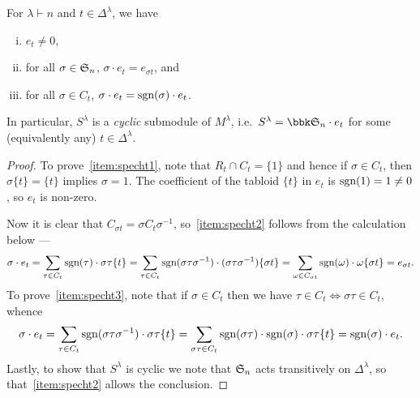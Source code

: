 \begin{lemma}
    \label{lem:polytabloidaction}
    For $\lambda \vdash n$ and $t\in \Delta^\lambda$, we have
    \begin{enumerate}[(i)]
        \item\label{item:specht1} $e_t\neq 0$, 
        \item\label{item:specht2} for all $\sigma\in\mathfrak{S}_{n}$, $\sigma\cdot e_t =
            e_{\sigma t}$, and 
        \item\label{item:specht3} for all $\sigma\in C_t$, $\sigma\cdot e_t =
            \textnormal{sgn}(\sigma)\cdot e_t$. 
    \end{enumerate}
    In particular, $S^\lambda$ is a \emph{cyclic} submodule of $M^\lambda$,
    i.e.\ $S^\lambda=\bbk \sym{n}\cdot e_t$ for some (equivalently any) $t\in
    \Delta^\lambda$.

    \begin{proof}
        To prove~\ref{item:specht1}, note that $R_t\cap C_t=\{1\}$ and hence if
        $\sigma\in C_t$, then $\sigma\{t\} = \{t\}$ implies $\sigma=1$. The
        coefficient of the tabloid $\{t\}$ in $e_t$ is
        $\textnormal{sgn}(1)=1\neq 0$, so $e_t$ is non-zero.
        
        Now it is clear that $C_{\sigma t} = \sigma C_t \sigma^{-1}$,
        so~\ref{item:specht2} follows from the calculation below ---
        \begin{align*}
            \sigma \cdot e_t 
            = \sum_{\tau\in C_t} \textnormal{sgn}(\tau)\cdot \sigma \tau\{t\} 
            = \sum_{\tau \in C_t}\textnormal{sgn}(\sigma\tau\sigma^{-1})\cdot
            (\sigma\tau\sigma^{-1})\{\sigma t\} 
            = \sum_{\omega\in C_{\sigma
            t}}\textnormal{sgn}(\omega)\cdot \omega\{\sigma t\} = e_{\sigma t}.
        \end{align*}
        To prove~\ref{item:specht3}, note that if $\sigma\in C_t$ then we have
        $\tau\in C_t\iff \sigma\tau\in C_t$, whence
        \[
            \sigma\cdot e_t = \sum_{\tau\in C_t}
            \textnormal{sgn}(\sigma\tau\sigma^{-1})\cdot \sigma\tau\{t\} =
            \sum_{\sigma\tau\in C_t} \textnormal{sgn}(\sigma\tau)\cdot
            \textnormal{sgn}(\sigma)\cdot \sigma\tau\{t\} =
            \textnormal{sgn}(\sigma)\cdot  e_t.
        \]
        Lastly, to show that $S^\lambda$ is cyclic we note
        that $\mathfrak{S}_{n}$ acts transitively on $\Delta^\lambda$, so
        that~\ref{item:specht2} allows the conclusion.
    \end{proof}
\end{lemma}

